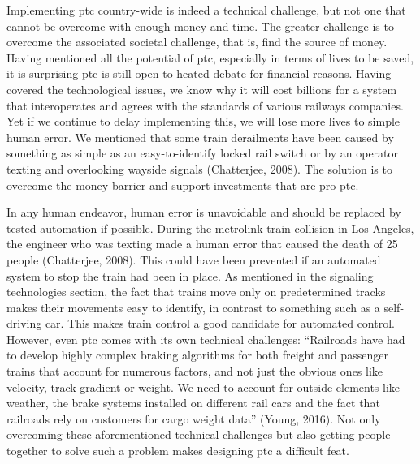 \documentclass[11pt, titlepage]{article}
\begin{document}
Implementing \gls{ptc} country-wide is indeed a technical challenge, but not one
that cannot be overcome with enough money and time. The greater challenge is to
overcome the associated societal challenge, that is, find the source of money.
Having mentioned all the potential of \gls{ptc}, especially in terms of lives to
be saved, it is surprising \gls{ptc} is still open to heated debate for financial
reasons. Having covered the technological issues, we know why it will cost
billions for a system that interoperates and agrees with the standards of various
railways companies. Yet if we continue to delay implementing this, we will lose
more lives to simple human error. We mentioned that some train derailments have
been caused by something as simple as an easy-to-identify locked rail switch
or by an operator texting and overlooking wayside signals (Chatterjee, 2008). The solution
is to overcome the money barrier and support
investments that are pro-\gls{ptc}.

In any human endeavor, human error is unavoidable and should be replaced by tested
automation if possible. During the \gls{metrolink} train collision in Los Angeles,
the engineer who was texting made a human error that caused the death of 25
people (Chatterjee, 2008). This could have been prevented if an automated system to
stop the train had been in place. As mentioned in the signaling technologies
section, the fact that trains move only on predetermined tracks makes their
movements easy to identify, in contrast to something such as a self-driving car.
This makes train control a good candidate for automated control. However, even
\gls{ptc} comes with its own technical challenges: ``Railroads have had to develop
highly complex braking algorithms for both freight and passenger trains that
account for numerous factors, and not just the obvious ones like velocity, track
gradient or weight. We need to account for outside elements like weather, the
brake systems installed on different rail cars and the fact that railroads rely on
customers for cargo weight data'' (Young, 2016). Not only overcoming these
aforementioned technical challenges but also getting people together to solve such
a problem makes designing \gls{ptc} a difficult feat.
\end{document}
